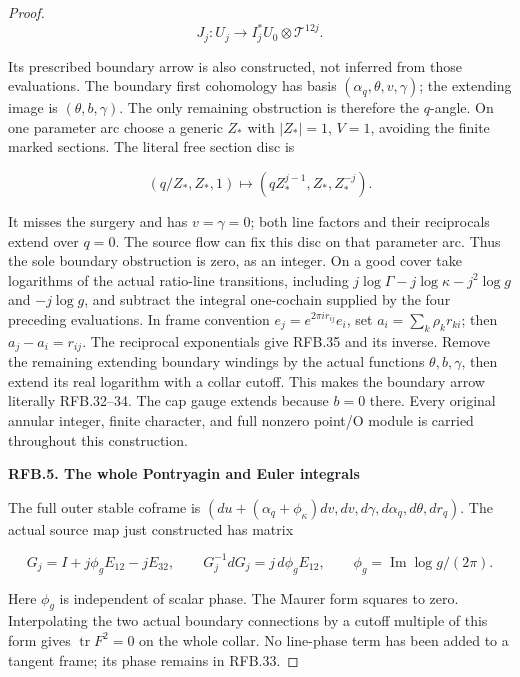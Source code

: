 \begin{proof}
\[
          J_j:U_j\longrightarrow I_j^*U_0\otimes\mathcal T^{12j}.
 \tag{RFB.35}
\]

Its prescribed boundary arrow is also constructed, not inferred
from those evaluations. The boundary first cohomology has basis
\((\alpha_q,\theta,v,\gamma)\); the extending image is
\((\theta,b,\gamma)\). The only remaining obstruction is therefore
the \(q\)-angle. On one parameter arc choose a generic \(Z_*\)
with \(|Z_*|=1\), \(V=1\), avoiding the finite marked sections.
The literal free section disc is

\[
 (q/Z_*,Z_*,1)\mapsto(qZ_*^{j-1},Z_*,Z_*^{-j}).
 \tag{RFB.36}
\]

It misses the surgery and has \(v=\gamma=0\); both line factors
and their reciprocals extend over \(q=0\). The source flow can fix
this disc on that parameter arc. Thus the sole boundary obstruction
is zero, as an integer. On a good cover take logarithms of the
actual ratio-line transitions, including
\(j\log\Gamma-j\log\kappa-j^2\log g\) and \(-j\log g\),
and subtract the integral one-cochain supplied by the four preceding
evaluations. In frame convention \(e_j=e^{2\pi ir_{ij}}e_i\),
set \(a_i=\sum_k\rho_kr_{ki}\); then \(a_j-a_i=r_{ij}\).
The reciprocal exponentials give RFB.35 and its inverse. Remove
the remaining extending boundary windings by the actual functions
\(\theta,b,\gamma\), then extend its real logarithm with a collar
cutoff. This makes the boundary arrow literally RFB.32--34. The
cap gauge extends because \(b=0\) there. Every original annular
integer, finite character, and full nonzero point/O module is
carried throughout this construction.

\par

\medskip\noindent\textbf{RFB.5. The whole Pontryagin and Euler integrals}

\par\nobreak

The full outer stable coframe is
\((du+(\alpha_q+\phi_\kappa)dv,dv,d\gamma,d\alpha_q,d\theta,dr_q)\).
The actual source map just constructed has matrix

\[
 G_j=I+j\phi_gE_{12}-jE_{32},\qquad
 G_j^{-1}dG_j=j\,d\phi_gE_{12},\qquad
 \phi_g=\operatorname{Im}\log g/(2\pi).
 \tag{RFB.37}
\]

Here \(\phi_g\) is independent of scalar phase. The Maurer form
squares to zero. Interpolating the two actual boundary connections
by a cutoff multiple of this form gives \(\operatorname{tr}F^2=0\)
on the whole collar. No line-phase term has been added to a tangent
frame; its phase remains in RFB.33.


\end{proof}

